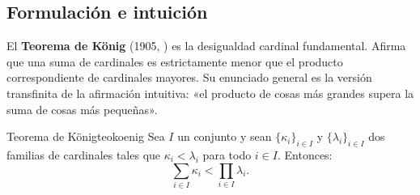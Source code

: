\subsection{Formulación e intuición}

El \textbf{Teorema de König} (1905, \cite{konig1905}) es la desigualdad cardinal fundamental. Afirma que una suma de cardinales es estrictamente menor que el producto correspondiente de cardinales mayores. Su enunciado general es la versión transfinita de la afirmación intuitiva: «el producto de cosas más grandes supera la suma de cosas más pequeñas».

\begin{teorema}{Teorema de König}{teokoenig}
Sea $I$ un conjunto y sean $\{\kappa_i\}_{i \in I}$ y $\{\lambda_i\}_{i \in I}$ dos familias de cardinales tales que $\kappa_i < \lambda_i$ para todo $i \in I$. Entonces:
\[
  \sum_{i \in I} \kappa_i < \prod_{i \in I} \lambda_i.
\]
\end{teorema}

